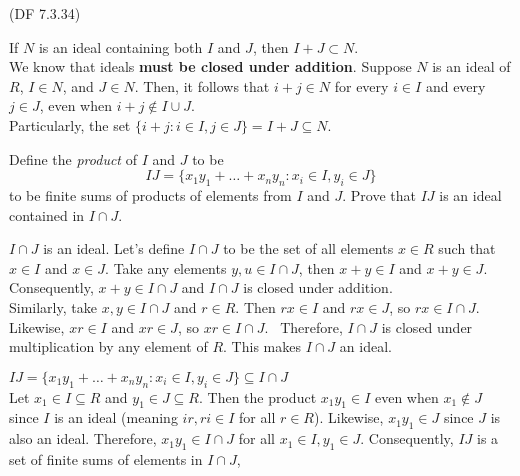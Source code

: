\begin{problem}{(\textsf{DF 7.3.34})}
\begin{enumalph}
\begin{Answer}
\begin{enumroman}
            \newpage
            \item If $N$ is an ideal containing both $I$ and $J$, then $I + J \subset N$. \\
              We know that ideals \textbf{must be closed under addition}.
              Suppose $N$ is an ideal of $R$, $I \in N$, and $J \in N$.
              Then, it follows that $i + j \in N$ for every $i \in I$ and every $j \in J$,
              even when $i + j \notin I \cup J$. \\
              Particularly, the set $\{ i + j : i \in I, j \in J\} = I + J \subseteq N$.              
          \end{enumroman}
        \end{Answer}
    \item Define the \emph{product} of $I$ and $J$ to be
      \[ IJ = \{x_1y_1 + \dots + x_ny_n : x_i \in I, y_i \in J\} \]
      to be finite sums of products of elements from $I$ and $J$.
      Prove that $IJ$ is an ideal contained in $I \cap J$.
      \begin{Answer}
        \begin{enumroman}
          \item $I \cap J$ is an ideal.
            Let's define $I \cap J$ to be the set of all elements $x \in R$
            such that $x \in I$ and $x \in J$.
            Take any elements $y, u \in I \cap J$, then $x + y \in I$ 
            and $x + y \in J$. Consequently, $x + y \in I \cap J$
            and $I \cap J$ is closed under addition.~\label{1.10} \\
            Similarly, take $x, y \in I \cap J$ and $r \in R$.
            Then $rx \in I$ and $rx \in J$, so $rx \in I \cap J$.~\label{1.11} \\
            Likewise, $x r \in I$ and $x r \in J$, so $x r \in I \cap J$.~\label{1.12}
            Therefore, $I \cap J$ is closed under multiplication by any element of $R$.
            This makes $I \cap J$ an ideal.
          \item $IJ = \{x_1y_1 + \dots + x_ny_n : x_i \in I, y_i \in J\} \subseteq I \cap J$ \\
            Let $x_1 \in I \subseteq R$ and $y_1 \in J \subseteq R$.
            Then the product $x_1y_1 \in I$ even when 
            $x_1 \notin J$ since $I$ is an ideal (meaning $ir, ri \in I$ for all $r \in R$).
            Likewise, $x_1y_1 \in J$ since $J$ is also an ideal.
            Therefore, $x_1y_1 \in I \cap J$ for all $x_1 \in I, y_1 \in J$.
            Consequently, $IJ$ is a set of finite sums of elements in $I \cap J$,

\end{enumroman}
\end{Answer}
\end{enumalph}
\end{problem}
